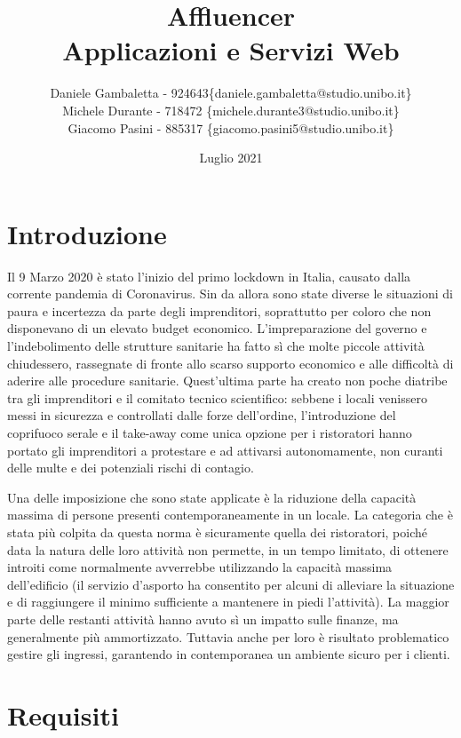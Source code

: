 \documentclass[a4paper]{report}
\title{
    Affluencer \\
    \large Applicazioni e Servizi Web
}
\author{
    Daniele Gambaletta - 924643\{daniele.gambaletta@studio.unibo.it\}
    \\
    Michele Durante - 718472 \{michele.durante3@studio.unibo.it\}
    \\
    Giacomo Pasini - 885317 \{giacomo.pasini5@studio.unibo.it\}
}
\date{Luglio 2021}
\begin{document}
\maketitle

\pagebreak

\tableofcontents

\pagebreak

\chapter{Introduzione}

Il 9 Marzo 2020 è stato l'inizio del primo lockdown in Italia, causato dalla corrente pandemia di Coronavirus. Sin da allora sono state diverse le situazioni di paura e incertezza da parte degli imprenditori, soprattutto per coloro che non disponevano di un elevato budget economico. L'impreparazione del governo e l'indebolimento delle strutture sanitarie ha fatto sì che molte piccole attività chiudessero, rassegnate di fronte allo scarso supporto economico e alle difficoltà di aderire alle procedure sanitarie. Quest'ultima parte ha creato non poche diatribe tra gli imprenditori e il comitato tecnico scientifico: sebbene i locali venissero messi in sicurezza e controllati dalle forze dell’ordine, l'introduzione del coprifuoco serale e il take-away come unica opzione per i ristoratori hanno portato gli imprenditori a protestare e ad attivarsi autonomamente, non curanti delle multe e dei potenziali rischi di contagio.

Una delle imposizione che sono state applicate è la riduzione della capacità massima di persone presenti contemporaneamente in un locale. La categoria che è stata più colpita da questa norma è sicuramente quella dei ristoratori, poiché data la natura delle loro attività non permette, in un tempo limitato, di ottenere introiti come normalmente avverrebbe utilizzando la capacità massima dell'edificio (il servizio d'asporto ha consentito per alcuni di alleviare la situazione e di raggiungere il minimo sufficiente a mantenere in piedi l'attività). La maggior parte delle restanti attività hanno avuto sì un impatto sulle finanze, ma generalmente più ammortizzato. Tuttavia anche per loro è risultato problematico gestire gli ingressi, garantendo in contemporanea un ambiente sicuro per i clienti.

\pagebreak

\chapter{Requisiti}
\end{document}
